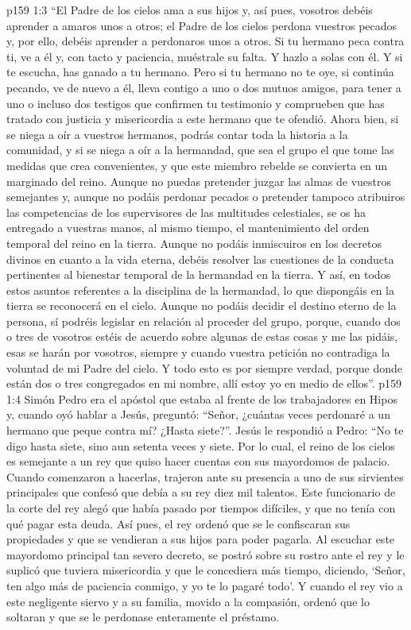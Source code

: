 \vs p159 1:3 “El Padre de los cielos ama a sus hijos y, así pues, vosotros debéis aprender a amaros unos a otros; el Padre de los cielos perdona vuestros pecados y, por ello, debéis aprender a perdonaros unos a otros. Si tu hermano peca contra ti, ve a él y, con tacto y paciencia, muéstrale su falta. Y hazlo a solas con él. Y si te escucha, has ganado a tu hermano. Pero si tu hermano no te oye, si continúa pecando, ve de nuevo a él, lleva contigo a uno o dos mutuos amigos, para tener a uno o incluso dos testigos que confirmen tu testimonio y comprueben que has tratado con justicia y misericordia a este hermano que te ofendió. Ahora bien, si se niega a oír a vuestros hermanos, podrás contar toda la historia a la comunidad, y si se niega a oír a la hermandad, que sea el grupo el que tome las medidas que crea convenientes, y que este miembro rebelde se convierta en un marginado del reino. Aunque no puedas pretender juzgar las almas de vuestros semejantes y, aunque no podáis perdonar pecados o pretender tampoco atribuiros las competencias de los supervisores de las multitudes celestiales, se os ha entregado a vuestras manos, al mismo tiempo, el mantenimiento del orden temporal del reino en la tierra. Aunque no podáis inmiscuiros en los decretos divinos en cuanto a la vida eterna, debéis resolver las cuestiones de la conducta pertinentes al bienestar temporal de la hermandad en la tierra. Y así, en todos estos asuntos referentes a la disciplina de la hermandad, lo que dispongáis en la tierra se reconocerá en el cielo. Aunque no podáis decidir el destino eterno de la persona, sí podréis legislar en relación al proceder del grupo, porque, cuando dos o tres de vosotros estéis de acuerdo sobre algunas de estas cosas y me las pidáis, esas se harán por vosotros, siempre y cuando vuestra petición no contradiga la voluntad de mi Padre del cielo. Y todo esto es por siempre verdad, porque donde están dos o tres congregados en mi nombre, allí estoy yo en medio de ellos”.
\vs p159 1:4 \pc Simón Pedro era el apóstol que estaba al frente de los trabajadores en Hipos y, cuando oyó hablar a Jesús, preguntó: “Señor, ¿cuántas veces perdonaré a un hermano que peque contra mí? ¿Hasta siete?”. Jesús le respondió a Pedro: “No te digo hasta siete, sino aun setenta veces y siete. Por lo cual, el reino de los cielos es semejante a un rey que quiso hacer cuentas con sus mayordomos de palacio. Cuando comenzaron a hacerlas, trajeron ante su presencia a uno de sus sirvientes principales que confesó que debía a su rey diez mil talentos. Este funcionario de la corte del rey alegó que había pasado por tiempos difíciles, y que no tenía con qué pagar esta deuda. Así pues, el rey ordenó que se le confiscaran sus propiedades y que se vendieran a sus hijos para poder pagarla. Al escuchar este mayordomo principal tan severo decreto, se postró sobre su rostro ante el rey y le suplicó que tuviera misericordia y que le concediera más tiempo, diciendo, ‘Señor, ten algo más de paciencia conmigo, y yo te lo pagaré todo’. Y cuando el rey vio a este negligente siervo y a su familia, movido a la compasión, ordenó que lo soltaran y que se le perdonase enteramente el préstamo.
